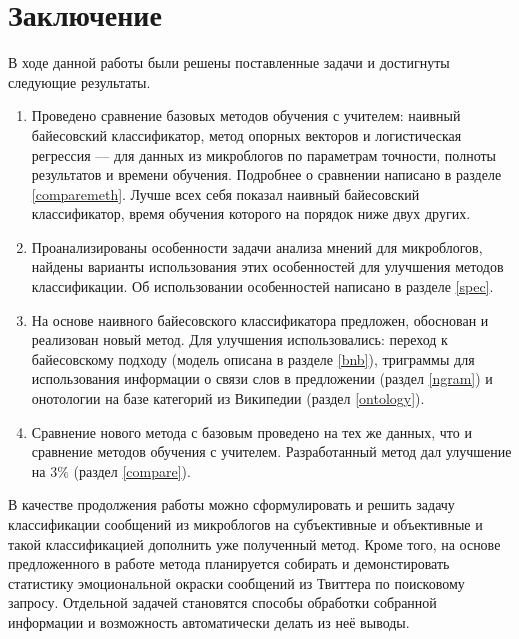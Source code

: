 \section*{Заключение}
В ходе данной работы были решены поставленные задачи и достигнуты следующие результаты.
\begin{enumerate}
\item Проведено сравнение базовых методов обучения с учителем: наивный байесовский классификатор,
  метод опорных векторов и логистическая регрессия --- для данных из микроблогов по
  параметрам точности, полноты результатов и времени обучения. Подробнее о сравнении написано в
  разделе \ref{comparemeth}. Лучше всех себя показал наивный байесовский классификатор, время
  обучения которого на порядок ниже двух других.
\item Проанализированы особенности задачи анализа мнений для микроблогов, найдены варианты
  использования этих особенностей для улучшения методов классификации. Об использовании особенностей
  написано в разделе \ref{spec}.
\item На основе наивного байесовского классификатора предложен, обоснован и реализован новый
  метод. Для улучшения использовались: переход к байесовскому подходу (модель описана в разделе
  \ref{bnb}), триграммы для использования информации о связи слов в предложении (раздел \ref{ngram})
  и онотологии на базе категорий из Википедии (раздел \ref{ontology}).
\item Сравнение нового метода с базовым проведено на тех же данных, что и сравнение методов обучения
  с учителем. Разработанный метод дал улучшение на $3\%$ (раздел \ref{compare}).
\end{enumerate}

В качестве продолжения работы можно сформулировать и решить задачу классификации сообщений
из микроблогов на субъективные и объективные и такой классификацией дополнить уже
полученный метод. Кроме того, на основе предложенного в работе метода планируется собирать и
демонстировать статистику эмоциональной окраски сообщений из Твиттера по поисковому
запросу. Отдельной задачей становятся способы обработки собранной информации и возможность
автоматически делать из неё выводы.
